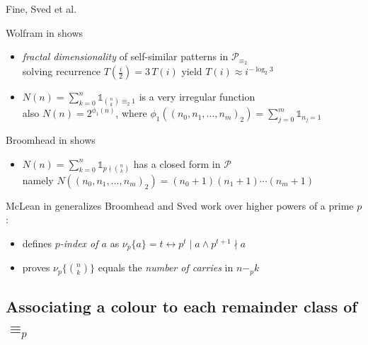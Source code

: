 \documentclass[10pt,serif, professionalfont]{beamer}
\begin{document}
\begin{frame}{Fine, Sved et al.}
    \begin{block}{Wolfram in \cite{Wolfram1984} shows}
        \begin{itemize}
            \item {\normalsize \emph{fractal dimensionality} of self-similar patterns in $\mathcal{P}_{\equiv_{2}}$}\\
                \footnotesize{solving recurrence $T(\frac{i}{2})=3\,T(i)$ yield $T(i)\approx i^{-\log_{2}{3}}$}
            \item {\normalsize $N(n)=\sum_{k=0}^{n}{\mathbb{1}_{{{n}\choose{k}}\equiv_{2}1}}$ is a very irregular function }\\
                \footnotesize{also $N(n)=2^{\phi_{1}(n)}$, where $ \phi_{1}((n_{0},n_{1},\ldots,n_{m})_{2})=
                    \sum_{j=0}^{m}{\mathbb{1}_{n_{j}=1} }$}
        \end{itemize}
    \end{block}
    \pause
    \begin{block}{Broomhead in \cite{Broomhead1972} shows}
        \begin{itemize}
            \item {\normalsize $N(n)=\sum_{k=0}^{n}{\mathbb{1}_{p\nmid{{n}\choose{k}}}}$ has a closed form in $\mathcal{P}$}\\
                \footnotesize{namely $N((n_{0},n_{1},\ldots,n_{m})_{2})=(n_{0}+1)(n_{1}+1)\cdots(n_{m}+1)$}
        \end{itemize}
    \end{block}
    \pause
    \begin{block}{McLean in \cite{Lean1974} generalizes}
        Broomhead and Sved work over higher powers of a prime $p$:
        \begin{itemize}
            \item defines \emph{$p$-index of $a$} as {$\nu_{p}\lbrace a\rbrace =t \leftrightarrow p^{t}\mid a \wedge p^{t+1}\nmid a$}
            \item proves {$\nu_{p}\lbrace {{n}\choose{k}}\rbrace $} equals the \emph{number of carries} in $n-_{p}k$
        \end{itemize}
    \end{block}
\end{frame}

\subsection{Associating a colour to each remainder class of $\equiv_{p}$}
\end{document}
